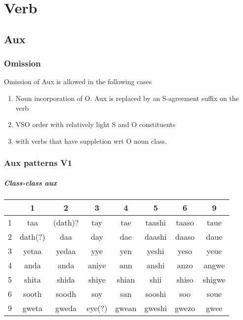\documentclass[8pt]{book}
\begin{document}
\chapter{Verb}

\section{Aux}

\subsection{Omission}
Omission of Aux is allowed in the following cases
\begin{enumerate}
	\item Noun incorporation of O. Aux is replaced by an S-agreement suffix on the verb
	\item VSO order with relatively light S and O constituents
	\item with verbs that have suppletion wrt O noun class.
\end{enumerate}

\subsection{Aux patterns V1}
\paragraph{Class-class aux}

\begin{center}
	\begin{tabular}{|l|c|c|c|c|c|c|c|}
	\hline
	& 1 & 2 & 3 & 4 & 5 & 6 & 9 \\ \hline
	1 & taa & (dath)? & tay & tae & taashi & taaso & taue \\ \hline
	2 & dath(?) & daa & day & dae & daashi & daaso & daue \\ \hline
	3 & yetaa & yedaa & yye & yen & yeshi & yeso & yeue \\ \hline
	4 & anda & anda & aniye & ann & anshi & anzo & angwe \\ \hline
	5 & shita & shida & shiye & shian & shii & shiso & shigwe \\ \hline
    6 & sooth & soodh & soy & san & sooshi & soo & soue \\ \hline
    9 & gweta & gweda & eye(?) & gwean & gweshi & gwezo & gwee \\ \hline
	\end{tabular}
\end{center}
\end{document}
